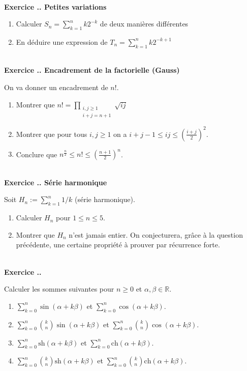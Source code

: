 \documentclass{article}
\newcommand{\mb}[1]{\mathbb{#1}}
\newcounter{exo}
\newcommand{\exercice}[1][\null]{\textbf{\\ \large Exercice \thesection.\theexo. \normalsize #1} \addtocounter{exo}{1}}
\begin{document}
\exercice[Petites variations]

\begin{enumerate}
    \item Calculer $S_n = \sum_{k =1}^{n} k 2^{-k}$ de deux manières 
        différentes
    \item En déduire une expression de  $T_n = \sum_{k=1}^{n} k 2^{-k+1}$
\end{enumerate}

\exercice[Encadrement de la factorielle (Gauss)]

On va donner un encadrement de $n !$.

\begin{enumerate}

\item Montrer que $\displaystyle n! = \prod_{\substack{i,j \ge 1\\i+j = n+1}}  \sqrt{ij}$

\item Montrer que pour tous $i,j \ge 1$ on a $i+j-1 \le ij \le (\frac{i+j}{2})^2$.

\item Conclure que $n^{\frac{n}{2}} \le n ! \le (\frac{n+1}{2})^n$.

\end{enumerate}




\exercice[Série harmonique]

Soit $ H_n := \sum_{k =1}^n 1/k$ (série harmonique).

\begin{enumerate}

\item Calculer $H_n$ pour $1\le n \le 5$.

\item Montrer que $H_n$ n'est jamais entier. On conjecturera, grâce à la question précédente, une certaine propriété à prouver par récurrence forte.

\end{enumerate}



\exercice Calculer les sommes suivantes pour $n \ge 0$ et $\alpha, \beta \in \mb{R}$.

\begin{enumerate}

\item $\displaystyle \sum_{k=0}^n \sin(\alpha + k\beta)$ et $\displaystyle \sum_{k=0}^n \cos(\alpha + k\beta)$. 

\item $\displaystyle \sum_{k=0}^n {k \choose n} \sin(\alpha + k\beta)$ et $\displaystyle \sum_{k=0}^n {k \choose n} \cos(\alpha + k\beta)$.

\item $\displaystyle \sum_{k=0}^n \text{sh}(\alpha + k\beta)$ et $\displaystyle \sum_{k=0}^n \text{ch}(\alpha + k\beta)$. 

\item $\displaystyle \sum_{k=0}^n {k \choose n} \text{sh}(\alpha + k\beta)$ et $\displaystyle \sum_{k=0}^n {k \choose n} \text{ch}(\alpha + k\beta)$.

\end{enumerate}
\end{document}

